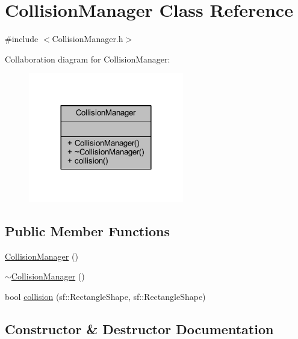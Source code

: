 \hypertarget{class_collision_manager}{}\section{Collision\+Manager Class Reference}
\label{class_collision_manager}


{\ttfamily \#include $<$Collision\+Manager.\+h$>$}



Collaboration diagram for Collision\+Manager\+:
\nopagebreak
\begin{figure}[H]
\begin{center}
\leavevmode
\includegraphics[width=192pt]{class_collision_manager__coll__graph}
\end{center}
\end{figure}
\subsection*{Public Member Functions}
\begin{DoxyCompactItemize}
\item 
\hyperlink{class_collision_manager_a81f0b3f0cc0268c80f54714cd7ddb55f}{Collision\+Manager} ()
\item 
\hyperlink{class_collision_manager_acdbb3c842f0ef1c7a028d3f080855766}{$\sim$\+Collision\+Manager} ()
\item 
bool \hyperlink{class_collision_manager_affe670241642e07380fff0050d8ef459}{collision} (sf\+::\+Rectangle\+Shape, sf\+::\+Rectangle\+Shape)
\end{DoxyCompactItemize}


\subsection{Constructor \& Destructor Documentation}
\mbox{\label{class_collision_manager_a81f0b3f0cc0268c80f54714cd7ddb55f}} 
